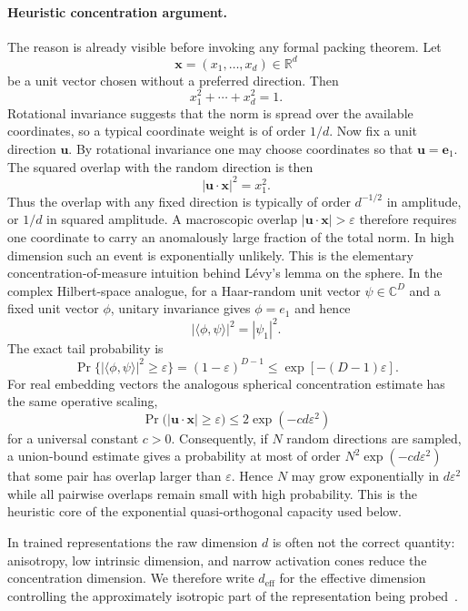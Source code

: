 \documentclass[%
  reprint,
  superscriptaddress,
  showpacs,
  showkeys,
  amsmath,amssymb,
  pra,
  longbibliography,
  floatfix,
  x11names
]{revtex4-2}
\begin{document}
\paragraph*{Heuristic concentration argument.}
The reason is already visible before invoking any formal packing theorem.
Let
\[
        \bm{x}=(x_1,\ldots,x_d)\in\mathbb{R}^d
\]
be a unit vector chosen without a preferred direction.  Then
\[
        x_1^2+\cdots+x_d^2=1 .
\]
Rotational invariance suggests that the norm is spread over the available
coordinates, so a typical coordinate weight is of order $1/d$.  Now fix a unit
direction $\bm{u}$.  By rotational invariance one may choose coordinates so
that $\bm{u}=\bm{e}_1$.  The squared overlap with the random direction is
then
\[
        |\bm{u}\cdot\bm{x}|^2=x_1^2 .
\]
Thus the overlap with any fixed direction is typically of order $d^{-1/2}$ in
amplitude, or $1/d$ in squared amplitude.  A macroscopic overlap
$|\bm{u}\cdot\bm{x}|>\varepsilon$ therefore requires one coordinate to carry
an anomalously large fraction of the total norm.  In high dimension such an
event is exponentially unlikely.  This is the elementary concentration-of-measure
intuition behind L\'evy's lemma on the sphere.  In the complex Hilbert-space
analogue, for a Haar-random unit vector $\psi\in\mathbb{C}^D$ and a
fixed unit vector $\phi$, unitary invariance gives $\phi=e_1$ and hence
\[
        |\langle\phi,\psi\rangle|^2=|\psi_1|^2 .
\]
The exact tail probability is
\[
        \Pr\bigl\{|\langle\phi,\psi\rangle|^2\geq\varepsilon\bigr\}
        =(1-\varepsilon)^{D-1}
        \leq \exp[-(D-1)\varepsilon] .
\]
For real embedding vectors the analogous spherical concentration estimate has
the same operative scaling,
\begin{equation}
  \Pr\bigl(|\bm{u}\cdot\bm{x}|\geq \varepsilon\bigr)
  \leq 2\exp(-c d\varepsilon^2)
\end{equation}
for a universal constant $c>0$.  Consequently, if $N$ random directions are
sampled, a union-bound estimate gives a probability at most of order
$N^2\exp(-c d\varepsilon^2)$ that some pair has overlap larger than
$\varepsilon$.  Hence $N$ may grow exponentially in $d\varepsilon^2$ while
all pairwise overlaps remain small with high probability.  This is the
heuristic core of the exponential quasi-orthogonal capacity used below.

In trained representations the raw dimension $d$ is often not the correct
quantity: anisotropy, low intrinsic dimension, and narrow activation cones
reduce the concentration dimension. We therefore write $d_{\mathrm{eff}}$ for
the effective dimension controlling the approximately isotropic part of the
representation being probed~\cite{svozil-2026-llm}.
\end{document}
